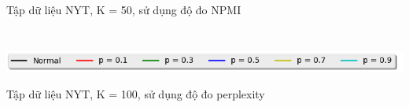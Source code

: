 \documentclass[pdf]{beamer}
\begin{document}
\begin{frame}{Tập dữ liệu NYT, K = 50, sử dụng độ đo NPMI }
\begin{columns}[T]
\begin{column}{.50\textwidth}
\begin{figure}
	\end{figure}				
\end{column} %
\end{columns}
\begin{center}
\includegraphics[width=1\textwidth]{menu.png}	
\end{center}
\end{frame}

\begin{frame}{Tập dữ liệu NYT, K = 100, sử dụng độ đo perplexity }

\begin{columns}[T] %
	\begin{column}{.50\textwidth}
		\begin{figure}
		\end{figure}
	\end{column} %
	\hfill%
	\begin{column}{.50\textwidth}
		\begin{figure}

\end{figure}
\end{column}
\end{columns}
\end{frame}
\end{document}
